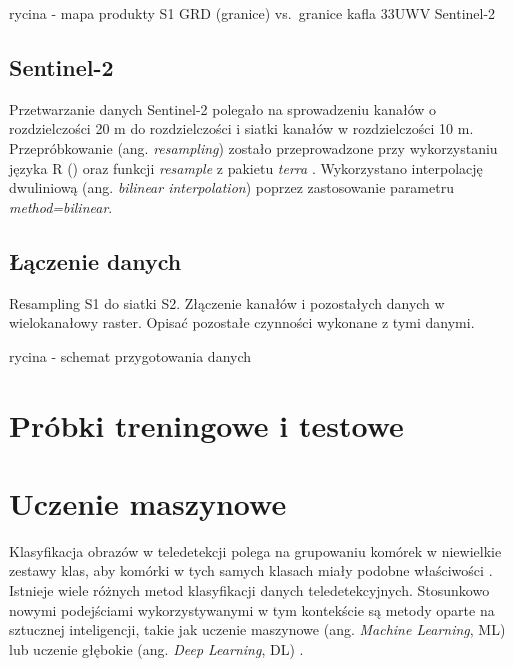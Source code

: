 \documentclass{amuthesis}
\begin{document}
rycina - mapa produkty S1 GRD (granice) vs.~granice kafla 33UWV
Sentinel-2

\hypertarget{sec-processing-s2}{%
\subsection{Sentinel-2}\label{sec-processing-s2}}

Przetwarzanie danych Sentinel-2 polegało na sprowadzeniu kanałów o
rozdzielczości 20 m do rozdzielczości i siatki kanałów w rozdzielczości
10 m. Przepróbkowanie (ang. \emph{resampling}) zostało przeprowadzone
przy wykorzystaniu języka R (\textcite{R-base}) oraz funkcji
\emph{resample} z pakietu \emph{terra} \autocite{R-terra}. Wykorzystano
interpolację dwuliniową (ang. \emph{bilinear interpolation}) poprzez
zastosowanie parametru \emph{method=bilinear}.

\hypertarget{sec-processing-data-merging}{%
\subsection{Łączenie danych}\label{sec-processing-data-merging}}

Resampling S1 do siatki S2. Złączenie kanałów i pozostałych danych w
wielokanałowy raster. Opisać pozostałe czynności wykonane z tymi danymi.

rycina - schemat przygotowania danych

\hypertarget{sec-samples-methods}{%
\section{Próbki treningowe i testowe}\label{sec-samples-methods}}

\hypertarget{sec-machine-learning}{%
\section{Uczenie maszynowe}\label{sec-machine-learning}}

Klasyfikacja obrazów w teledetekcji polega na grupowaniu komórek w
niewielkie zestawy klas, aby komórki w tych samych klasach miały podobne
właściwości \autocite{ismail_2009_classification}. Istnieje wiele
różnych metod klasyfikacji danych teledetekcyjnych. Stosunkowo nowymi
podejściami wykorzystywanymi w tym kontekście są metody oparte na
sztucznej inteligencji, takie jak uczenie maszynowe (ang. \emph{Machine
Learning}, ML) lub uczenie głębokie (ang. \emph{Deep Learning}, DL)
\autocite{hejmanowska_2020_dane}.
\end{document}
